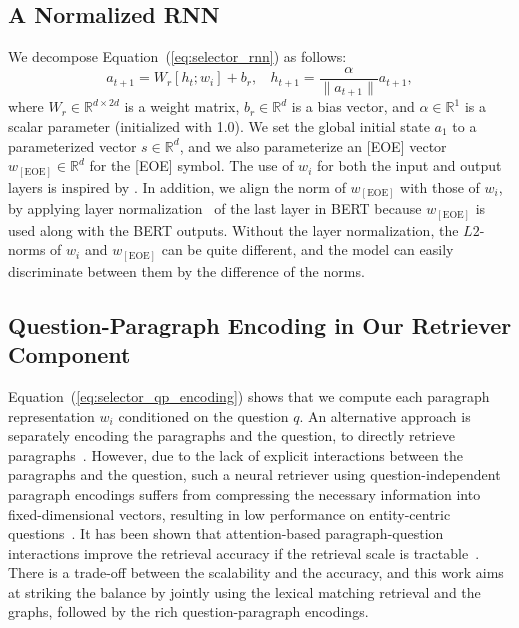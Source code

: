 \subsection{A Normalized RNN}
\label{subsec:normalized_rnn}
We  decompose Equation~(\ref{eq:selector_rnn}) as follows:
\begin{equation}
a_{t+1} = W_r [h_t; w_i] + b_r,~~~~h_{t+1} = \frac{\alpha}{\|a_{t+1}\|} a_{t+1},
\end{equation}
where $W_r\in\mathbb{R}^{d\times 2d}$ is a weight matrix, $b_r\in\mathbb{R}^{d}$ is a bias vector, and $\alpha\in\mathbb{R}^{1}$ is a scalar parameter (initialized with 1.0).
We set the global initial state $a_1$ to a parameterized vector $s\in\mathbb{R}^{d}$, and we also parameterize an [EOE] vector $w_\mathrm{[EOE]}\in\mathbb{R}^{d}$ for the [EOE] symbol.
The use of $w_i$ for both the input and output layers is inspired by \citet{tai_softmax,tai_softmax_2}.
In addition, we align the norm of $w_\mathrm{[EOE]}$ with those of $w_i$, by applying layer normalization~\citep{Ba2016LayerN} of the last layer in BERT because $w_\mathrm{[EOE]}$ is used along with the BERT outputs.
Without the layer normalization, the $L2$-norms of $w_i$ and $w_\mathrm{[EOE]}$ can be quite different, and the model can easily discriminate between them by the difference of the norms.

\subsection{Question-Paragraph Encoding in Our Retriever Component}
\label{subsec:appendix_qp-encoding}

Equation~(\ref{eq:selector_qp_encoding}) shows that we compute each paragraph representation $w_i$ conditioned on the question $q$.
An alternative approach is separately encoding the paragraphs and the question, to directly retrieve paragraphs~\citep{lee-chang-toutanova:2019:ACL2019,denspi,das2019multi}. 
However,
due to the lack of explicit interactions between the paragraphs and the question, such a neural retriever using question-independent paragraph encodings suffers from compressing the necessary information into fixed-dimensional vectors, resulting in low performance on entity-centric questions~\citep{lee-chang-toutanova:2019:ACL2019}.
It has been shown that attention-based paragraph-question interactions improve the retrieval accuracy if the retrieval scale is tractable~\citep{wang2018r,lee2018ranking}.
There is a trade-off between the scalability and the accuracy, and this work aims at striking the balance by jointly using the lexical matching retrieval and the graphs, followed by the rich question-paragraph encodings.

